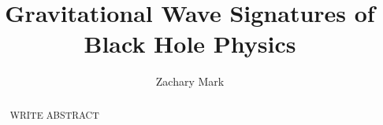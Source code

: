 \documentclass[12pt]{caltech_thesis}
\begin{document}
\title{Gravitational Wave Signatures of Black Hole Physics}
\author{Zachary Mark}


\address{Pasadena, California}                     %



\maketitle[logo]

\begin{acknowledgements} 	 
  
\end{acknowledgements}

\begin{abstract}
WRITE ABSTRACT
  
\end{abstract}

\begin{publishedcontent}[iknowwhattodo]
  \nocite{Scheel:2014ina,Giesler:2017uyu,Giesler:2019uxc,Isi:2019aib,
    Lovelace:2014twa,Bhagwat:2017tkm}
\end{publishedcontent}


\tableofcontents
\listoffigures
\listoftables
\printnomenclature

\mainmatter

%
%
%



\printindex

\end{document}
